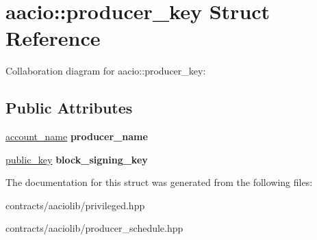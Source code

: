 \hypertarget{structaacio_1_1producer__key}{}\section{aacio\+:\+:producer\+\_\+key Struct Reference}
\label{structaacio_1_1producer__key}


Collaboration diagram for aacio\+:\+:producer\+\_\+key\+:
\subsection*{Public Attributes}
\begin{DoxyCompactItemize}
\item 
\mbox{\label{structaacio_1_1producer__key_a5caf0f6645d1d5e8461ed02d846e6917}} 
\mbox{\hyperlink{structaacio_1_1chain_1_1name}{account\+\_\+name}} {\bfseries producer\+\_\+name}
\item 
\mbox{\label{structaacio_1_1producer__key_a5385ad1c5271d0fa0ae7160239ca8164}} 
\mbox{\hyperlink{structaacio_1_1public__key}{public\+\_\+key}} {\bfseries block\+\_\+signing\+\_\+key}
\end{DoxyCompactItemize}


The documentation for this struct was generated from the following files\+:\begin{DoxyCompactItemize}
\item 
contracts/aaciolib/privileged.\+hpp\item 
contracts/aaciolib/producer\+\_\+schedule.\+hpp\end{DoxyCompactItemize}
